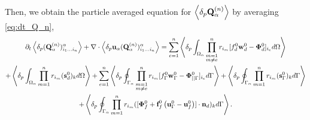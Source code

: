 \documentclass[11pt]{My_preprint}
\providecommand{\DIFaddbegin}{} %
\providecommand{\DIFaddend}{} %
\providecommand{\DIFdelbegin}{} %
\providecommand{\DIFdelend}{} %
\begin{document}
Then, we obtain the particle averaged equation for $\left<\delta_p \textbf{Q}_\alpha^{(n)}\right>$ by averaging \ref{eq:dt_Q_n},
\begin{multline*}
    \pddt \DIFdelbegin %
\DIFdelend \DIFaddbegin \pavg{(\textbf{Q}_\alpha^{(n)})_{i_1\ldots i_n}^\alpha}
    \DIFaddend + \div  \DIFdelbegin %
\DIFdelend \DIFaddbegin \pavg{\textbf{u}_\alpha (\textbf{Q}_\alpha^{(n)})_{i_1\ldots i_n}^\alpha}
    \DIFaddend = \sum_{e=1}^{n} 
    \pOavg{
        \prod^{n}_{\substack{ m=1 \\m \neq e}} r_{i_m} [f_d^0\textbf{w}_d^0  - \bm\Phi_d^0]_{i_e}
    }\\
    + \pOavg{ \pri{1}{n} (\textbf{s}_d^0)_k }
    +     
    \sum_{e=1}^{n} 
    \pSavg{
        \prod^{n}_{\substack{ m=1 \\m \neq e}} r_{i_m} [f_\Gamma^0\textbf{w}_\Gamma^0 - \bm\Phi_{||\Gamma}^0]_{i_e}
    }
    + \pSavg{ \pri{1}{n} (\textbf{s}_\Gamma^0)_k }\\
    +\pSavg{ \pri{1}{n} ([\bm\Phi_f^0 + \textbf{f}_f^0 \left(\textbf{u}_\Gamma^0 - \textbf{u}_f^0\right)]\cdot \textbf{n}_d)_k }. 
\end{multline*}
\end{document}

